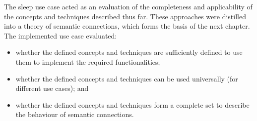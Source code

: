 % 
% 
% 





The sleep use case acted as an evaluation of the completeness and applicability of the concepts and techniques described thus far. These approaches were distilled into a theory of semantic connections, which forms the basis of the next chapter. The implemented use case evaluated: 
\begin{itemize}
	\item whether the defined concepts and techniques are sufficiently defined to use them to implement the required functionalities;
	\item whether the defined concepts and techniques can be used universally (for different use cases); and
	\item  whether the defined concepts and techniques form a complete set to describe the behaviour of semantic connections.
\end{itemize}

